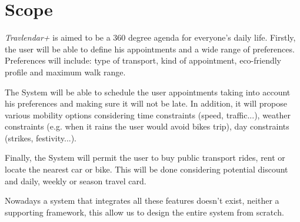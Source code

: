 \section{Scope}

\emph{Travlendar+} is aimed to be a 360 degree agenda for everyone's daily life.
Firstly, the user will be able to define his appointments and a wide range of preferences. Preferences will include: type of transport, kind of appointment, eco-friendly profile and maximum walk range.

The System will be able to schedule the user appointments taking into account his preferences and making sure it will not be late. In addition, it will propose various mobility options considering time constraints (speed, traffic...), weather constraints (e.g. when it rains the user would avoid bikes trip), day constraints (strikes, festivity...). 

Finally, the System will permit the user to buy public transport rides, rent or locate the nearest car or bike. This will be done considering potential discount and daily, weekly or season travel card.

Nowadays a system that integrates all these features doesn't exist, neither a supporting framework, this allow us to design the entire system from scratch. 